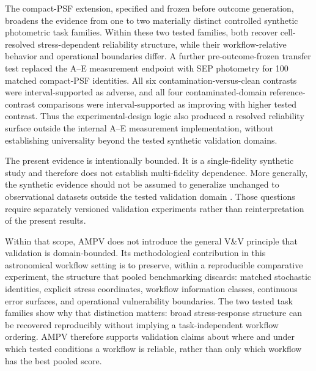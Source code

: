 The compact-PSF extension, specified and frozen before outcome
generation, broadens the evidence from one to two materially distinct
controlled synthetic photometric task families. Within these two tested
families, both recover cell-resolved stress-dependent reliability
structure, while their workflow-relative behavior and operational
boundaries differ. A further pre-outcome-frozen transfer test replaced
the A--E measurement endpoint with SEP photometry for 100 matched
compact-PSF identities. All six contamination-versus-clean contrasts
were interval-supported as adverse, and all four contaminated-domain
reference-contrast comparisons were interval-supported as improving
with higher tested contrast. Thus the experimental-design logic also
produced a resolved reliability surface outside the internal A--E
measurement implementation, without establishing universality beyond
the tested synthetic validation domains.

The present evidence is intentionally bounded. It is a single-fidelity
synthetic study and therefore does not establish multi-fidelity
dependence. More generally, the synthetic evidence should not be assumed
to generalize unchanged to observational datasets outside the tested
validation domain \cite{ref5,ref6}. Those questions require separately
versioned validation experiments rather than reinterpretation of the present results.

Within that scope, AMPV does not introduce the general V\&V principle that validation is domain-bounded. Its methodological contribution in this astronomical workflow setting is to preserve, within a reproducible comparative experiment, the structure that pooled benchmarking discards: matched
stochastic identities, explicit stress coordinates, workflow information
classes, continuous error surfaces, and operational vulnerability
boundaries. The two tested task families show why that distinction
matters: broad stress-response structure can be recovered reproducibly
without implying a task-independent workflow ordering. AMPV therefore
supports validation claims about where and under which tested conditions a
workflow is reliable, rather than only which workflow has the best pooled
score.



